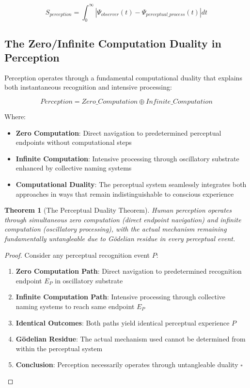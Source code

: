 \documentclass[12pt]{article}
\newtheorem{theorem}{Theorem}
\begin{document}
$$S_{perception} = \int_0^{\infty} |\Psi_{observer}(t) - \Psi_{perceptual\_process}(t)| dt$$

\subsection{The Zero/Infinite Computation Duality in Perception}

Perception operates through a fundamental computational duality that explains both instantaneous recognition and intensive processing:

$$Perception = Zero\_Computation \oplus Infinite\_Computation$$

Where:
\begin{itemize}
\item \textbf{Zero Computation}: Direct navigation to predetermined perceptual endpoints without computational steps
\item \textbf{Infinite Computation}: Intensive processing through oscillatory substrate enhanced by collective naming systems
\item \textbf{Computational Duality}: The perceptual system seamlessly integrates both approaches in ways that remain indistinguishable to conscious experience
\end{itemize}

\begin{theorem}[The Perceptual Duality Theorem]
Human perception operates through simultaneous zero computation (direct endpoint navigation) and infinite computation (oscillatory processing), with the actual mechanism remaining fundamentally untangleable due to Gödelian residue in every perceptual event.
\end{theorem}

\begin{proof}
Consider any perceptual recognition event $P$:
\begin{enumerate}
\item \textbf{Zero Computation Path}: Direct navigation to predetermined recognition endpoint $E_P$ in oscillatory substrate
\item \textbf{Infinite Computation Path}: Intensive processing through collective naming systems to reach same endpoint $E_P$
\item \textbf{Identical Outcomes}: Both paths yield identical perceptual experience $P$
\item \textbf{Gödelian Residue}: The actual mechanism used cannot be determined from within the perceptual system
\item \textbf{Conclusion}: Perception necessarily operates through untangleable duality $\square$
\end{enumerate}
\end{proof}
\end{document}
